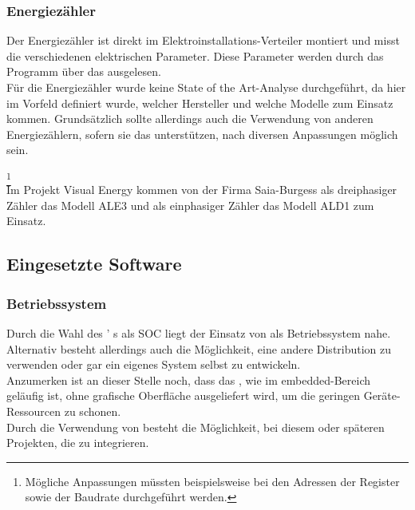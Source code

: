 \documentclass[Bachelorarbeit.tex]{subfiles}
\begin{document}
\subsubsection*{Energiezähler}
Der Energiezähler ist direkt im Elektroinstallations-Verteiler montiert und misst die 
verschiedenen elektrischen Parameter. Diese Parameter werden durch das Programm 
über das  ausgelesen. \\
Für die Energiezähler wurde keine State of the Art-Analyse durchgeführt, da hier im 
Vorfeld definiert wurde, welcher Hersteller und welche Modelle zum Einsatz kommen. 
Grundsätzlich sollte allerdings auch die Verwendung von anderen Energiezählern, sofern 
sie das  unterstützen, nach diversen Anpassungen möglich sein.
\begin{comment}
Mögliche Anpassungen wären die Adressen der verwendeten Register um die Energie Werte auszulesen, sowie eventuelle Konfiguration wie zum Beispiel die Slaveadresse oder die Baudrate anzupassen.
\end{comment}
\footnote{Mögliche Anpassungen müssten beispielsweise bei den Adressen der Register sowie der Baudrate durchgeführt werden.}\\
Im Projekt Visual Energy kommen von der Firma Saia-Burgess als dreiphasiger Zähler das
Modell ALE3 und als einphasiger Zähler das Modell ALD1 zum Einsatz.


\subsection{Eingesetzte Software}
\subsubsection*{Betriebssystem}
Durch die Wahl des ' s als \ac{SOC} liegt der Einsatz von  als Betriebssystem nahe. Alternativ besteht allerdings auch die 
Möglichkeit, eine andere Distribution zu verwenden oder gar ein eigenes System selbst zu 
entwickeln.\\
Anzumerken ist an dieser Stelle noch, dass das , wie im embedded-Bereich geläufig ist, ohne grafische Oberfläche ausgeliefert wird, um die geringen Geräte-Ressourcen zu schonen.\\
Durch die Verwendung von  besteht die Möglichkeit, bei diesem oder 
späteren Projekten, die  zu integrieren.
\end{document}
